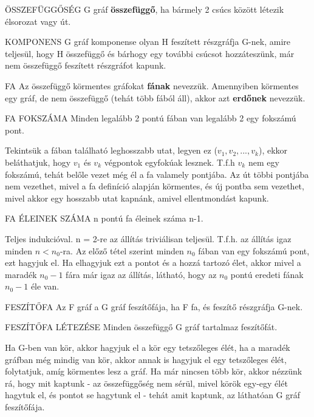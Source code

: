 \begin{definicio}{ÖSSZEFÜGGŐSÉG}
G gráf \textbf{összefüggő}, ha bármely 2 csúcs között létezik élsorozat vagy út.
\end{definicio}

\begin{definicio}{KOMPONENS}
G gráf komponense olyan H feszített részgráfja G-nek, amire teljesül, hogy H összefüggő és bárhogy egy további csúcsot hozzáteszünk, már nem összefüggő feszített részgráfot kapunk.
\end{definicio}

\begin{definicio}{FA}
Az összefüggő körmentes gráfokat \textbf{fának} nevezzük. Amennyiben körmentes egy gráf, de nem összefüggő (tehát több fából áll), akkor azt \textbf{erdőnek} nevezzük.
\end{definicio}

\begin{tetel}{FA FOKSZÁMA}
Minden legalább 2 pontú fában van legalább 2 egy fokszámú pont.
\end{tetel}

\begin{bizonyitas}{}
Tekintsük a fában található leghosszabb utat, legyen ez ($v_1, v_2,..., v_k$), ekkor beláthatjuk, hogy $v_1$ és $v_k$ végpontok egyfokúak lesznek. T.f.h $v_k$ nem egy fokszámú, tehát belőle vezet még él a fa valamely pontjába. Az út többi pontjába nem vezethet, mivel a fa definíció alapján körmentes, és új pontba sem vezethet, mivel akkor egy hosszabb utat kapnánk, amivel ellentmondást kapunk.
\end{bizonyitas}

\begin{tetel}{FA ÉLEINEK SZÁMA}
n pontú fa éleinek száma n-1.
\end{tetel}

\begin{bizonyitas}{}
Teljes indukcióval. n = 2-re az állítás triviálisan teljesül. T.f.h. az állítás igaz minden $n < n_0$-ra. Az előző tétel szerint minden $n_0$ fában van egy fokszámú pont, ezt hagyjuk el. Ha elhagyjuk ezt a pontot és a hozzá tartozó élet, akkor mivel a maradék $n_0 - 1$ fára már igaz az állítás, látható, hogy az $n_0$ pontú eredeti fának $n_0 - 1$ éle van.
\end{bizonyitas}

\begin{definicio}{FESZÍTŐFA}
Az F gráf a G gráf feszítőfája, ha F fa, és feszítő részgráfja G-nek.
\end{definicio}

\begin{tetel}{FESZÍTŐFA LÉTEZÉSE}
Minden összefüggő G gráf tartalmaz feszítőfát.
\end{tetel}

\begin{bizonyitas}{}
Ha G-ben van kör, akkor hagyjuk el a kör egy tetszőleges élét, ha a maradék gráfban még mindig van kör, akkor annak is hagyjuk el egy tetszőleges élét, folytatjuk, amíg körmentes lesz a gráf. Ha már nincsen több kör, akkor nézzünk rá, hogy mit kaptunk - az összefüggőség nem sérül, mivel körök egy-egy élét hagytuk el, és pontot se hagytunk el - tehát amit kaptunk, az láthatóan G gráf feszítőfája.
\end{bizonyitas}
